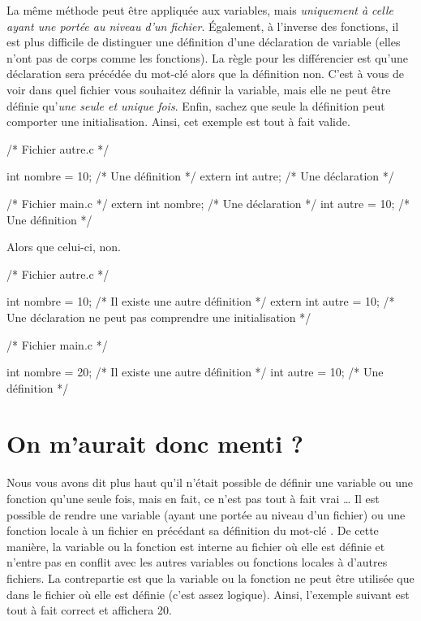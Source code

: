La même méthode peut être appliquée aux variables, mais \emph{uniquement
à celle ayant une portée au niveau d'un fichier}. Également, à l'inverse
des fonctions, il est plus difficile de distinguer une définition d'une
déclaration de variable (elles n'ont pas de corps comme les fonctions).
La règle pour les différencier est qu'une déclaration sera précédée du
mot-clé  alors que la définition non. C'est à vous de
voir dans quel fichier vous souhaitez définir la variable, mais elle ne
peut être définie qu'\emph{une seule et unique fois}. Enfin, sachez que
seule la définition peut comporter une initialisation. Ainsi, cet
exemple est tout à fait valide.

\begin{C}
/* Fichier autre.c */

int nombre = 10;    /* Une définition */
extern int autre;   /* Une déclaration */
\end{C}

\begin{C}
 /* Fichier main.c */
extern int nombre;  /* Une déclaration */
int autre = 10;     /* Une définition */
\end{C}


Alors que celui-ci, non.

\begin{C}
/* Fichier autre.c */

int nombre = 10;    /* Il existe une autre définition */
extern int autre = 10;  /* Une déclaration ne peut pas comprendre une initialisation */
\end{C}

\begin{C}
/* Fichier main.c */

int nombre = 20;    /* Il existe une autre définition */
int autre = 10;     /* Une définition */
\end{C}

\section{On m'aurait donc menti ?}
\label{on-maurait-donc-menti}

Nous vous avons dit plus haut qu'il n'était possible de définir une
variable ou une fonction qu'une seule fois, mais en fait, ce n'est pas
tout à fait vrai
\ldots{} Il est possible de rendre une variable (ayant
une portée au niveau d'un fichier) ou une fonction locale à un fichier
en précédant sa définition du mot-clé . De cette manière,
la variable ou la fonction est interne au fichier où elle est définie et
n'entre pas en conflit avec les autres variables ou fonctions locales à
d'autres fichiers. La contrepartie est que la variable ou la fonction ne
peut être utilisée que dans le fichier où elle est définie (c'est assez
logique). Ainsi, l'exemple suivant est tout à fait correct et affichera
20.

